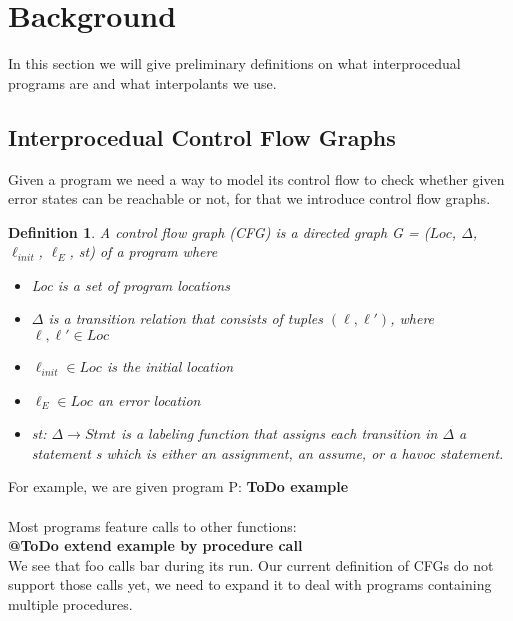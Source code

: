 \documentclass{article}
\newtheorem{mydef}{Definition}
\begin{document}
	\section{Background}
	In this section we will give preliminary definitions on what interprocedual programs are and what interpolants we use.
	
	
	\subsection{Interprocedual Control Flow Graphs}	
	Given a program we need a way to model its control flow to check whether given error states can be reachable or not, for that we introduce control flow graphs.
	
	\begin{mydef}
		A control flow graph (CFG) is a directed graph G = ($Loc$, $\Delta$, $\ell_{init}$, $\ell_E$, st) of a program where
		\begin{itemize}
			\item  Loc is a set of program locations
			\item $\Delta$ is a transition relation that consists of tuples $(\ell, \ell')$, where $\ell, \ell' \in Loc$
			\item $\ell_{init} \in Loc$ is the initial location
			\item $\ell_E \in Loc$ an error location
			\item st: $\Delta \rightarrow Stmt$ is a labeling function that assigns each transition in $\Delta$ a statement s which is either an assignment, an assume, or a havoc statement.
		\end{itemize}

	\end{mydef} \noindent
	For example, we are given program P: \textbf{ToDo example}
	\\ \\
	

	Most programs feature calls to other functions: \\
	\textbf{@ToDo extend example by procedure call} \\
	We see that foo calls bar during its run. Our current definition of CFGs do not support those calls yet, we need to expand it to deal with programs containing multiple procedures.
	
	
	
\end{document}

